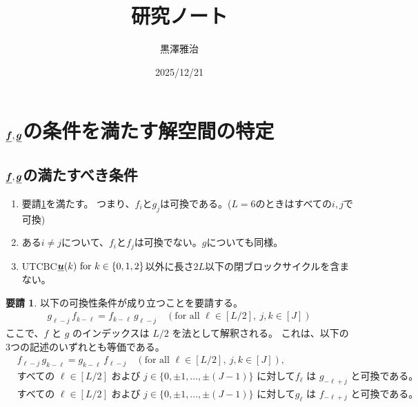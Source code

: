 \documentclass[a4paper,11pt,dvipdfmx]{jsarticle}
\theoremstyle{definition}
\newtheorem{requirement}[definition]{要請}
\begin{document}
\title{\textbf{研究ノート}}
\author{黒澤雅治}
\date{2025/12/21}
\maketitle

\section{$\underline{\bm{f}}, \underline{\bm{g}}$の条件を満たす解空間の特定}

\subsection{$\underline{\bm{f}}, \underline{\bm{g}}$の満たすべき条件}
\begin{enumerate}
  \item 要請\ref{req:1}を満たす。
    つまり、$f_iとg_j$は可換である。($L=6$のときはすべての$i,j$で可換)
  \item ある$i\neq j$について、$f_i$と$f_j$は可換でない。$g$についても同様。
  \item UTCBC$\underline{\bm{u}}(k)\text{ for }k\in\{0,1,2\}$以外に長さ$2L$以下の閉ブロックサイクルを含まない。\label{condition:c}
\end{enumerate}

\begin{requirement}\label{req:1}
  以下の可換性条件が成り立つことを要請する。
\begin{align}
  g_{\ell-j} \, f_{k-\ell} = f_{k-\ell} \, g_{\ell-j} \quad (\text{for all } \ell \in [L/2],\ j,k \in [J])
\end{align}
ここで、$f$ と $g$ のインデックスは $L/2$ を法として解釈される。
これは、以下の3つの記述のいずれとも等価である。
\begin{align}
& f_{\ell - j} \, g_{k - \ell} = g_{k - \ell} \, f_{\ell - j} \quad (\text{for all } \ell \in [L/2],\ j, k \in [J]),\\
& \text{すべての $\ell \in [L/2]$ および $j \in \{0,\pm 1,\ldots,\pm (J-1)\}$ に対して$f_\ell$ は $g_{- \ell + j}$ と可換である。}\\
 & \text{すべての $\ell \in [L/2]$ および $j \in \{0,\pm 1,\ldots,\pm (J-1)\}$ に対して$g_\ell$ は $f_{- \ell + j}$ と可換である。}
\end{align}
\end{requirement}
\end{document}
